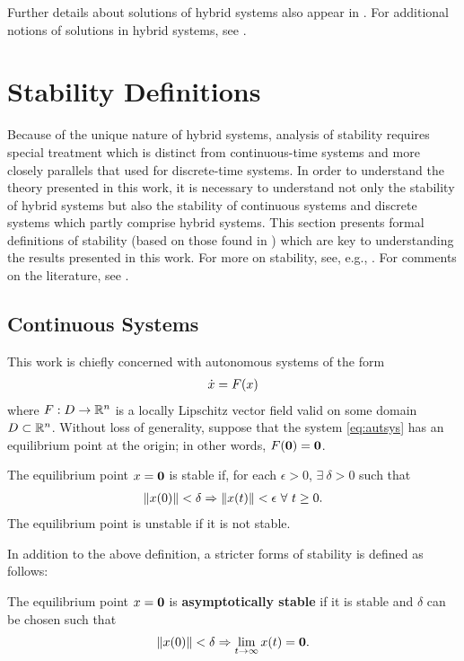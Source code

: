 Further details about solutions of hybrid systems also appear in
.
%
For additional notions of solutions in hybrid systems, see \cite{Filippov1988,
  Goebel2009, Haddad2001, Lygeros2003, Ye1998}.

\section{Stability Definitions} \label{sec:hsys-stability}

Because of the unique nature of hybrid systems, analysis of stability requires
special treatment which is distinct from continuous-time systems and more
closely parallels that used for discrete-time systems.
%
In order to understand the theory presented in this work, it is necessary to
understand not only the stability of hybrid systems but also the stability of
continuous systems and discrete systems which partly comprise hybrid systems.
%
This section presents formal definitions of stability (based on
those found in \cite[Ch. 4]{Khalil2002}) which are key to understanding the
results presented in this work.
%
For more on stability, see, e.g., \cite{Khalil2002, Teschl2012,
  Vidyasagar1993}.
%
For comments on the literature, see .

\subsection{Continuous Systems}
This work is chiefly concerned with autonomous systems of the form
\begin{align}
  \label{eq:autsys}
  {\dot {x}} = F(x)
\end{align}
where $F : D \to \mathbb{R}^{n}$ is a locally Lipschitz vector field valid on some
domain $D \subset \mathbb{R}^{n}$.
%
Without loss of generality, suppose that the system \eqref{eq:autsys} has an
equilibrium point at the origin;
%
in other words, $F({\mathbf 0}) = {\mathbf 0}$.
%
\begin{definition}
  The equilibrium point $x = {\mathbf 0}$ is stable if, for each $\epsilon > 0$,
  $\exists \ \delta > 0$ such that
  \begin{align*}
    \|x(0)\| < \delta \Rightarrow \|x(t)\| < \epsilon \ \forall \ t
    \geq 0.
  \end{align*}
  The equilibrium point is unstable if it is not stable.
\end{definition}

In addition to the above definition, a stricter forms of stability is defined as
follows:
%
\begin{definition}
  The equilibrium point $x = {\mathbf 0}$ is {\bf asymptotically stable} if it is
  stable and $\delta$ can be chosen such that
  \begin{align*}
    \|x(0)\| < \delta \Rightarrow \lim_{t \to \infty} x(t) = {\mathbf 0}.
  \end{align*}
\end{definition}

